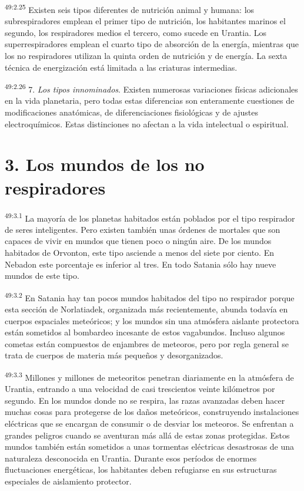 \par
\textsuperscript{49:2.25} Existen seis tipos diferentes de nutrición animal y humana: los subrespiradores emplean el primer tipo de nutrición, los habitantes marinos el segundo, los respiradores medios el tercero, como sucede en Urantia. Los superrespiradores emplean el cuarto tipo de absorción de la energía, mientras que los no respiradores utilizan la quinta orden de nutrición y de energía. La sexta técnica de energización está limitada a las criaturas intermedias.

\par
\textsuperscript{49:2.26} 7. \textit{Los tipos innominados}. Existen numerosas variaciones físicas adicionales en la vida planetaria, pero todas estas diferencias son enteramente cuestiones de modificaciones anatómicas, de diferenciaciones fisiológicas y de ajustes electroquímicos. Estas distinciones no afectan a la vida intelectual o espiritual.

\section*{3. Los mundos de los no respiradores}
\par
\textsuperscript{49:3.1} La mayoría de los planetas habitados están poblados por el tipo respirador de seres inteligentes. Pero existen también unas órdenes de mortales que son capaces de vivir en mundos que tienen poco o ningún aire. De los mundos habitados de Orvonton, este tipo asciende a menos del siete por ciento. En Nebadon este porcentaje es inferior al tres. En todo Satania sólo hay nueve mundos de este tipo.

\par
\textsuperscript{49:3.2} En Satania hay tan pocos mundos habitados del tipo no respirador porque esta sección de Norlatiadek, organizada más recientemente, abunda todavía en cuerpos espaciales meteóricos; y los mundos sin una atmósfera aislante protectora están sometidos al bombardeo incesante de estos vagabundos. Incluso algunos cometas están compuestos de enjambres de meteoros, pero por regla general se trata de cuerpos de materia más pequeños y desorganizados.

\par
\textsuperscript{49:3.3} Millones y millones de meteoritos penetran diariamente en la atmósfera de Urantia, entrando a una velocidad de casi trescientos veinte kilómetros por segundo. En los mundos donde no se respira, las razas avanzadas deben hacer muchas cosas para protegerse de los daños meteóricos, construyendo instalaciones eléctricas que se encargan de consumir o de desviar los meteoros. Se enfrentan a grandes peligros cuando se aventuran más allá de estas zonas protegidas. Estos mundos también están sometidos a unas tormentas eléctricas desastrosas de una naturaleza desconocida en Urantia. Durante esos períodos de enormes fluctuaciones energéticas, los habitantes deben refugiarse en sus estructuras especiales de aislamiento protector.

